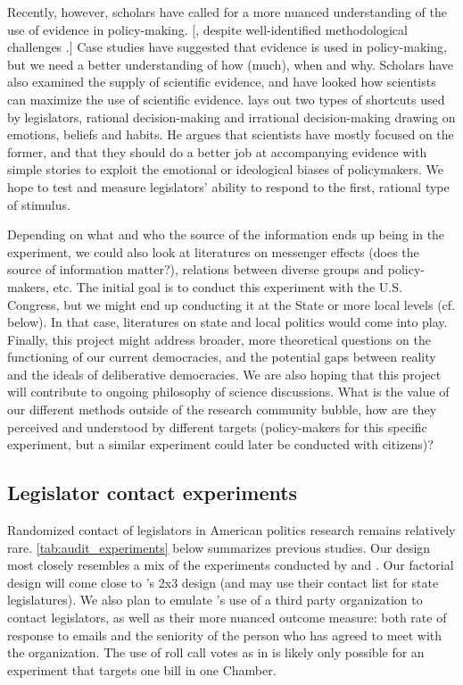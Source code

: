 \documentclass[12pt,final,fleqn]{article}
\theoremstyle{plain}
\begin{document}
Recently, however, scholars have called for a more nuanced understanding of the use of evidence in policy-making. [\citet{patashnik2016can}, despite well-identified methodological challenges \citep{mandell1984approaches}.] Case studies have suggested that evidence is used in policy-making, but we need a better understanding of how (much), when and why. Scholars have also examined the supply of scientific evidence, and have looked how scientists can maximize the use of scientific evidence. \citet{cairney2016politics} lays out two types of shortcuts used by legislators, rational decision-making and irrational decision-making drawing on emotions, beliefs and habits. He argues that scientists have mostly focused on the former, and that they should do a better job at accompanying evidence with simple stories to exploit the emotional or ideological biases of policymakers. We hope to test and measure legislators' ability to respond to the first, rational type of stimulus. 

Depending on what and who the source of the information ends up being in the experiment, we could also look at literatures on messenger effects (does the source of information matter?), relations between diverse groups and policy-makers, etc. The initial goal is to conduct this experiment with the U.S. Congress, but we might end up conducting it at the State or more local levels (cf. below). In that case, literatures on state and local politics would come into play. Finally, this project might address broader, more theoretical questions on the functioning of our current democracies, and the potential gaps between reality and the ideals of deliberative democracies. We are also hoping that this project will contribute to ongoing philosophy of science discussions. What is the value of our different methods outside of the research community bubble, how are they perceived and understood by different targets (policy-makers for this specific experiment, but a similar experiment could later be conducted with citizens)? 

\subsection{Legislator contact experiments}  \label{sec: contact experiments}

Randomized contact of legislators in American politics research remains relatively rare. \autoref{tab:audit_experiments} below summarizes previous studies. Our design most closely resembles a mix of the experiments conducted by \citet{butler2011politicians} and \citet{kalla2016campaign}. Our factorial design will come close to \citet{butler2011politicians}'s 2x3 design (and may use their contact list for state legislatures). We also plan to emulate \citet{kalla2016campaign}'s use of a third party organization to contact legislators, as well as their more nuanced outcome measure: both rate of response to emails and the seniority of the person who has agreed to meet with the organization. The use of roll call votes as in \citet{bergan2009does} is likely only possible for an experiment that targets one bill in one Chamber. 
\end{document}
